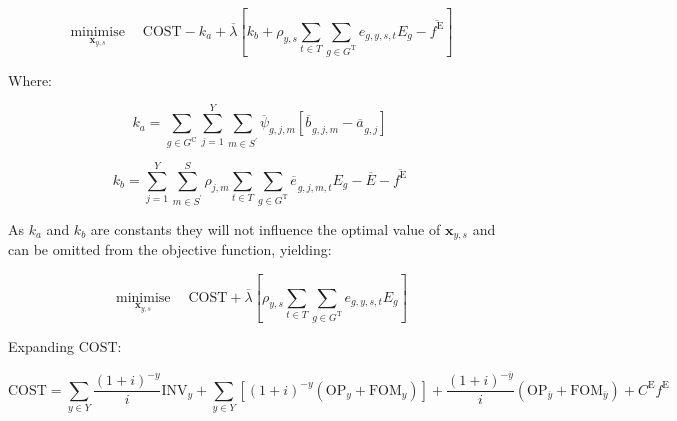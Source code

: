 \documentclass{article}
\newcommand{\sGeneratorsCandidate}{G^{\mathrm{C}}}
\newcommand{\sGeneratorsThermal}{G^{\mathrm{T}}}
\newcommand{\sYears}{Y}
\newcommand{\sScenarios}{S}
\newcommand{\sIntervals}{T}
\newcommand{\iGenerator}{g}
\newcommand{\iYear}{y}
\newcommand{\iYearTerminal}{\overline{\iYear}}
\newcommand{\iYearAlias}{j}
\newcommand{\iScenario}{s}
\newcommand{\iScenarioAlias}{m}
\newcommand{\iInterval}{t}
\newcommand{\cOperatingCost}[1][\iYear,\iScenario]{\mathrm{OP}_{#1}}
\newcommand{\cFixedOperationsMaintenanceCost}[1][\iGenerator]{\mathrm{FOM}_{#1}}
\newcommand{\cScenarioDuration}[1][\iYear,\iScenario]{\rho_{#1}}
\newcommand{\cEmissionsIntensity}[1][\iGenerator]{E_{#1}}
\newcommand{\cInvestmentCost}[1][\iYear]{\mathrm{INV}_{#1}}
\newcommand{\cInterestRate}{i}
\newcommand{\cEmmissionsCumulativeTarget}{\overline{E}}
\newcommand{\cEmissionsTargetViolationPenalty}{C^{\mathrm{E}}}
\newcommand{\cObjectiveFunction}{\mathrm{COST}}
\newcommand{\vEnergy}[1][\iGenerator,\iYear,\iScenario,\iInterval]{e_{#1}}
\newcommand{\vEmissionsTargetViolation}{f^{\mathrm{E}}}
\newcommand{\vInstalledCapacityTotal}[1][\iGenerator,\iYear]{a_{#1}}
\newcommand{\vInstalledCapacityTotalScenario}[1][\iGenerator,\iYear,\iScenario]{b_{#1}}
\DeclareMathOperator*{\minimise}{minimise}
\begin{document}
\begin{equation}
	\minimise\limits_{\bm{x}_{\iYear,\iScenario}} \quad\cObjectiveFunction - k_{a} + \overline{\lambda} \left[k_{b} + \cScenarioDuration\sum\limits_{\iInterval \in \sIntervals}\sum\limits_{\iGenerator \in \sGeneratorsThermal} \vEnergy[\iGenerator,\iYear,\iScenario,\iInterval] \cEmissionsIntensity - \overline{\vEmissionsTargetViolation}\right]
\end{equation}

Where:

\begin{equation}
	k_{a} = \sum\limits_{\iGenerator \in \sGeneratorsCandidate}\sum\limits_{\iYearAlias=1}^{\sYears}\sum\limits_{\iScenarioAlias \in\sScenarios^{\prime}}\overline{\psi}_{\iGenerator,\iYearAlias,\iScenarioAlias}\left[\overline{\vInstalledCapacityTotalScenario[]}_{\iGenerator,\iYearAlias,\iScenarioAlias} - \overline{\vInstalledCapacityTotal[]}_{\iGenerator,\iYearAlias}\right]
\end{equation}

\begin{equation}
	k_{b} = \sum\limits_{\iYearAlias=1}^{\sYears} \sum\limits_{\iScenarioAlias \in \sScenarios^{\prime}}^{\sScenarios} \cScenarioDuration[\iYearAlias,\iScenarioAlias] \sum\limits_{\iInterval \in \sIntervals} \sum\limits_{\iGenerator \in \sGeneratorsThermal} \overline{\vEnergy[]}_{\iGenerator,\iYearAlias,\iScenarioAlias,\iInterval} \cEmissionsIntensity - \cEmmissionsCumulativeTarget - \overline{\vEmissionsTargetViolation}
\end{equation}

As $k_{a}$ and $k_{b}$ are constants they will not influence the optimal value of $\bm{x}_{\iYear,\iScenario}$ and can be omitted from the objective function, yielding:

\begin{equation}
	\minimise\limits_{\bm{x}_{\iYear,\iScenario}} \quad \cObjectiveFunction + \overline{\lambda} \left[\cScenarioDuration\sum\limits_{\iInterval \in \sIntervals}\sum\limits_{\iGenerator \in \sGeneratorsThermal} \vEnergy[\iGenerator,\iYear,\iScenario,\iInterval] \cEmissionsIntensity \right]
\end{equation}

Expanding $\cObjectiveFunction$:

\begin{equation}
	\cObjectiveFunction = \sum\limits_{\iYear \in \sYears} \frac{(1+\cInterestRate)^{-\iYear}}{\cInterestRate}\cInvestmentCost + \sum\limits_{\iYear \in \sYears} \left[(1+\cInterestRate)^{-\iYear} (\cOperatingCost[\iYear] + \cFixedOperationsMaintenanceCost[\iYear]) \right] + \frac{(1+\cInterestRate)^{-\iYearTerminal}}{\cInterestRate} \left(\cOperatingCost[\iYearTerminal] + \cFixedOperationsMaintenanceCost[\iYearTerminal] \right) + \cEmissionsTargetViolationPenalty \vEmissionsTargetViolation
\end{equation}
\end{document}
